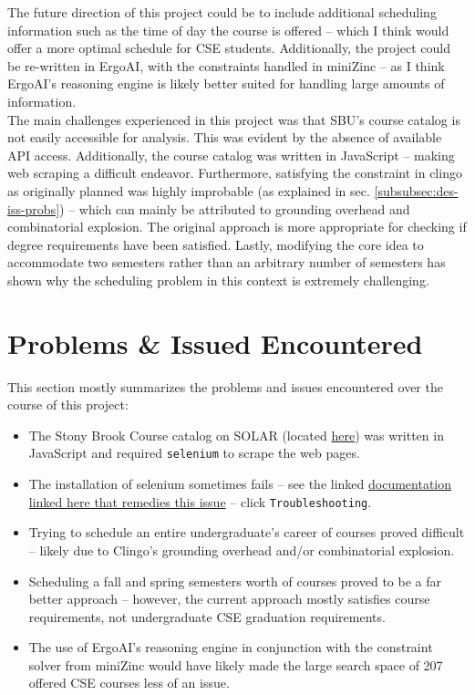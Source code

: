 \documentclass[12pt]{article}
\def \docLink{https://cse505.readthedocs.io/en/latest/?badge=latest}
\begin{document}
    The future direction of this project could be to include additional scheduling information such as the time of day the course is offered -- which I think would offer a more optimal schedule for CSE students. Additionally, the project could be re-written in ErgoAI, with the constraints handled in miniZinc -- as I think ErgoAI's reasoning engine is likely better suited for handling large amounts of information. \\
    The main challenges experienced in this project was that SBU's course catalog is not easily accessible for analysis. This was evident by the absence of available API access. Additionally, the course catalog was written in JavaScript -- making web scraping a difficult endeavor. Furthermore, satisfying the constraint in clingo as originally planned was highly improbable (as explained in sec. \ref{subsubsec:des-iss-probs}) -- which can mainly be attributed to grounding overhead and combinatorial explosion. The original approach is more appropriate for checking if degree requirements have been satisfied. Lastly, modifying the core idea to accommodate two semesters rather than an arbitrary number of semesters has shown why the scheduling problem in this context is extremely challenging.

    \section{Problems \& Issued Encountered}
    \label{sec:problems}

    This section mostly summarizes the problems and issues encountered over the course of this project:

    \begin{itemize}
        \item The Stony Brook Course catalog on SOLAR (located \href{https://prod.ps.stonybrook.edu/psc/csprodg/EMPLOYEE/CAMP/c/COMMUNITY_ACCESS.SSS_BROWSE_CATLG.GBL?}{here}) was written in JavaScript and required {\tt{selenium}} to scrape the web pages.
        \item The installation of selenium sometimes fails -- see the linked \href{\docLink}{documentation linked here that remedies this issue} -- click {\tt{Troubleshooting}}.
        \item Trying to schedule an entire undergraduate's career of courses proved difficult -- likely due to Clingo's grounding overhead and/or combinatorial explosion.
        \item Scheduling a fall and spring semesters worth of courses proved to be a far better approach -- however, the current approach mostly satisfies course requirements, not undergraduate CSE graduation requirements.
        \item The use of ErgoAI's reasoning engine in conjunction with the constraint solver from miniZinc would have likely made the large search space of 207 offered CSE courses less of an issue.
    \end{itemize}
\end{document}

